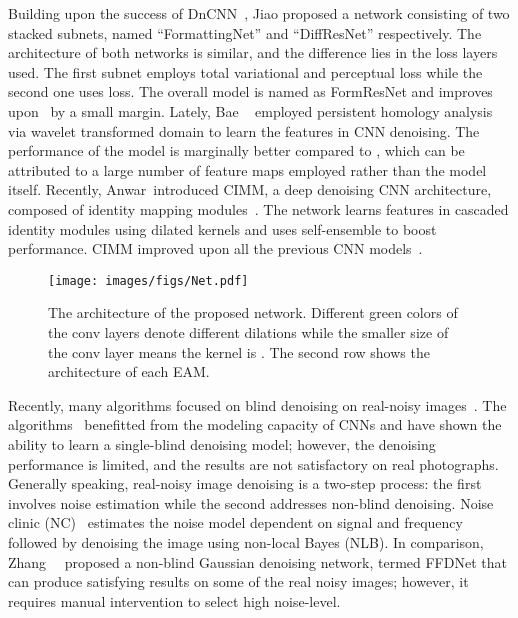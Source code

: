 \documentclass[10pt,twocolumn,letterpaper]{article}
\begin{document}
Building upon the success of  DnCNN~\cite{zhang2017DnCNN}, Jiao \etal proposed a network consisting of two stacked subnets, named  ``FormattingNet''  and  ``DiffResNet''  respectively. The architecture of both networks is similar, and the difference lies in the loss layers used. The first subnet employs total variational and perceptual loss while the second one uses  loss. The overall model is named as FormResNet and improves upon~\cite{zhang2017IRCNN,zhang2017DnCNN} by a small margin. Lately, Bae \etal~\cite{bae2017beyond} employed persistent homology analysis \cite{edelsbrunner2008persistent} via wavelet transformed domain to learn the features in CNN denoising. The performance of the model is marginally better compared to \cite{zhang2017DnCNN,jiao2017formresnet}, which can be attributed to a large number of feature maps employed rather than the model itself. Recently,  Anwar~\etal introduced CIMM, a deep denoising CNN architecture, composed of identity mapping modules~\cite{anwar2017chaining}. The network learns features in cascaded identity modules using dilated kernels and uses self-ensemble to boost performance. CIMM improved upon all the previous CNN models~\cite{zhang2017DnCNN,jiao2017formresnet}.







\begin{figure*}
\begin{center}
\texttt{[image: images/figs/Net.pdf]}\\ 
\end{center}
\vspace*{-3mm}
\caption {The architecture of the proposed network. Different green colors of the conv layers denote different dilations while the smaller size of the conv layer means the kernel is .  The second row shows the architecture of each EAM.}
\label{fig:net_architecture}
\vspace*{-5mm}
\end{figure*}



Recently, many algorithms focused on blind denoising on real-noisy images~\cite{plotz2018N3Net,guo2018CBDnet,brooks2019UPI}. The algorithms~\cite{zhang2017IRCNN,zhang2017DnCNN,jiao2017formresnet} benefitted from the modeling capacity of CNNs and have shown the ability to learn a single-blind denoising model; however, the denoising performance is limited, and the results are not satisfactory on real photographs.  Generally speaking, real-noisy image denoising is a two-step process: the first involves noise estimation while the second addresses
non-blind denoising. Noise clinic (NC)~\cite{lebrun2015NC} estimates the noise model dependent on signal and frequency followed by denoising the image using non-local Bayes (NLB). In comparison, Zhang~\etal~\cite{zhang2018ffdnet} proposed a non-blind Gaussian denoising network, termed FFDNet that can produce satisfying results on some of the real noisy images; however, it requires manual intervention to select high noise-level.
\end{document}
